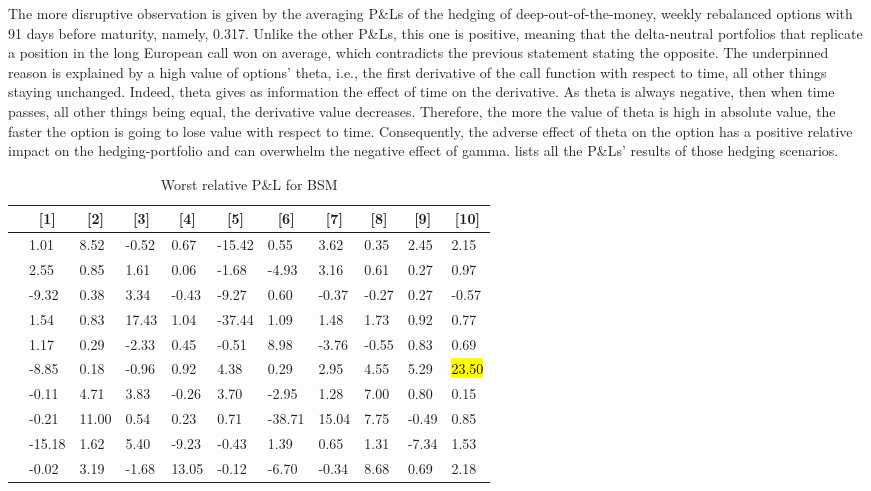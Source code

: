 \documentclass[12pt]{report}
\begin{document}
The more disruptive observation is given by the averaging P\&Ls of the hedging of deep-out-of-the-money, weekly rebalanced options with 91 days before maturity, namely, 0.317.
Unlike the other P\&Ls, this one is positive, meaning that the delta-neutral portfolios that replicate a position in the long European call won on average, which contradicts the previous statement stating the opposite.
The underpinned reason is explained by a high value of options' theta, i.e., the first derivative of the call function with respect to time, all other things staying unchanged.
Indeed, theta gives as information the effect of time on the derivative. As theta is always negative, then when time passes, all other things being equal, the derivative value decreases.
Therefore, the more the value of theta is high in absolute value, the faster the option is going to lose value with respect to time.
Consequently, the adverse effect of theta on the option has a positive relative impact on the hedging-portfolio and can overwhelm the negative effect of gamma.
 lists all the P\&Ls' results of those hedging scenarios.


\begin{table}[h]
\centering
\begin{tabular}{c|llllllllll}
  \hline
  \hline
  & \multicolumn{1}{c}{[1]} & \multicolumn{1}{c}{[2]} & \multicolumn{1}{c}{[3]} & \multicolumn{1}{c}{[4]} & \multicolumn{1}{c}{[5]} & \multicolumn{1}{c}{[6]} & \multicolumn{1}{c}{[7]} & \multicolumn{1}{c}{[8]} & \multicolumn{1}{c}{[9]} & \multicolumn{1}{c}{[10]} \\
  \hline
  [0] & 1.01 & 8.52 & -0.52 & 0.67 & -15.42 & 0.55 & 3.62 & 0.35 & 2.45 & 2.15 \\ \relax
  [10] & 2.55 & 0.85 & 1.61 & 0.06 & -1.68 & -4.93 & 3.16 & 0.61 & 0.27 & 0.97 \\ \relax
  [20] & -9.32 & 0.38 & 3.34 & -0.43 & -9.27 & 0.60 & -0.37 & -0.27 & 0.27 & -0.57 \\ \relax
  [30] & 1.54 & 0.83 & 17.43 & 1.04 & -37.44 & 1.09 & 1.48 & 1.73 & 0.92 & 0.77 \\ \relax
  [40] & 1.17 & 0.29 & -2.33 & 0.45 & -0.51 & 8.98 & -3.76 & -0.55 & 0.83 & 0.69 \\ \relax
  [50] & -8.85 & 0.18 & -0.96 & 0.92 & 4.38 & 0.29 & 2.95 & 4.55 & 5.29 & \hl{23.50} \\ \relax
  [60] & -0.11 & 4.71 & 3.83 & -0.26 & 3.70 & -2.95 & 1.28 & 7.00 & 0.80 & 0.15 \\ \relax
  [70] & -0.21 & 11.00 & 0.54 & 0.23 & 0.71 & -38.71 & 15.04 & 7.75 & -0.49 & 0.85 \\ \relax
  [80] & -15.18 & 1.62 & 5.40 & -9.23 & -0.43 & 1.39 & 0.65 & 1.31 & -7.34 & 1.53 \\ \relax
  [90] & -0.02 & 3.19 & -1.68 & 13.05 & -0.12 & -6.70 & -0.34 & 8.68 & 0.69 & 2.18 \\ 
   \hline
\end{tabular}
\caption{Worst relative P\&L for BSM} 
\label{t:analysis:bsm:pl:worst}
\end{table}
\end{document}
